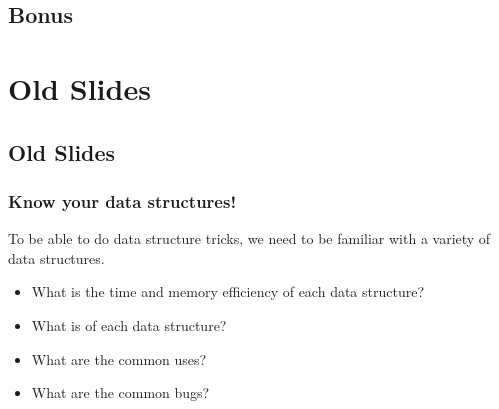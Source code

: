 \documentclass{beamer}
\begin{document}
\subsection{Bonus}

%




\section{Old Slides}
\subsection{Old Slides}

\begin{frame}
  \frametitle{Know your data structures!}
  \begin{block}{}
    To be able to do data structure tricks, we need to be familiar
    with a variety of data structures.
  \end{block}

  \bigskip

  \begin{itemize}
  \item What is the time and memory efficiency of each data structure?
  \item What is  of each data structure?
  \item What are the common uses?
  \item What are the common bugs?
  \end{itemize}
  
\end{frame}
\end{document}
